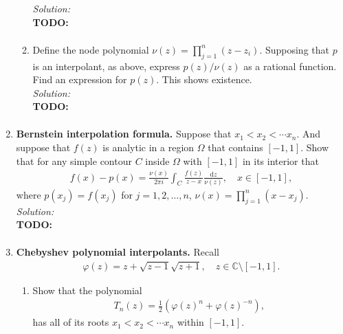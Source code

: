\documentclass[10pt]{amsart}
\newcommand{\D}{\mathrm{d}}
\theoremstyle{nonumberplain}
\begin{document}
\begin{enumerate}[label={\bf {\arabic*}:}]
\begin{enumerate}
\noindent
\textit{Solution:} \\
\textbf{TODO:}
\begin{align*}
\end{align*}

\item Define the node polynomial $\nu(z) = \prod_{j=1}^n( z - z_i)$.
Supposing that $p$ is an interpolant, as above, express $p(z)/\nu(z)$ as a rational function. 
Find an expression for $p(z)$. This shows existence.\\

\noindent
\textit{Solution:} \\
\textbf{TODO:}
\begin{align*}
\end{align*}

\end{enumerate}
\newpage


\item \textbf{Bernstein interpolation formula.}   Suppose that $x_1 < x_2 <
  \cdots x_n$.  And suppose that $f(z)$ is analytic in a region
  $\Omega$ that contains $[-1,1]$.  Show that for any simple contour
  $C$ inside $\Omega$ with $[-1,1]$ in its interior that
  \begin{align*}
    f(x) - p(x) = \frac{\nu(x)}{2 \pi i} \int_C \frac{f(z)}{z - x}
    \frac{\D z}{\nu(z)}, \quad x \in [-1,1],
  \end{align*}
  where $p(x_j) = f(x_j)$ for $j = 1,2,\ldots,n$, $\nu(x) =
  \prod_{j=1}^n (x - x_j)$.\\

\noindent
\textit{Solution:} \\
\textbf{TODO:}
\begin{align*}
\end{align*}

\newpage


\item  \textbf{Chebyshev polynomial interpolants.}  Recall 
\begin{align*}
\varphi(z) = z + \sqrt{z - 1} \sqrt{z +1}, \quad z \in \mathbb C \setminus [-1,1].
\end{align*}

\begin{enumerate}
\item Show that the polynomial
\begin{align*}
T_n(z) = \frac 1 2 \left( \varphi(z)^n + \varphi(z)^{-n} \right),
\end{align*}
has all of its roots $x_1 < x_2 < \cdots x_n$ within $[-1,1]$. \\


\end{enumerate}
\end{enumerate}
\end{document}
